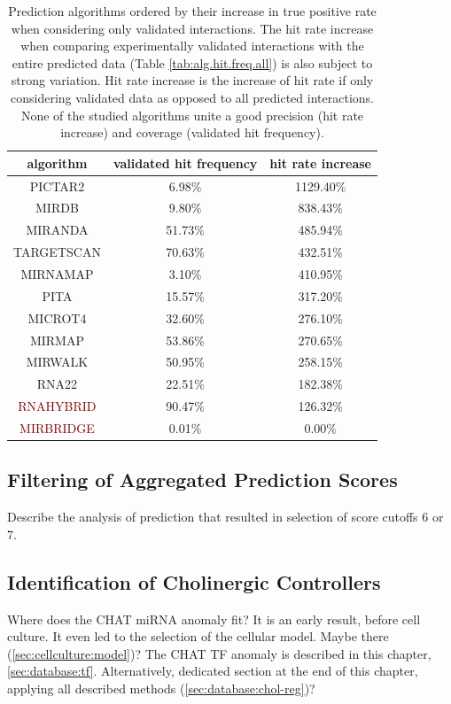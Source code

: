 \begin{table}
\centering
\begin{tabular}{c | c | c}
algorithm & validated hit frequency & hit rate increase\\ \hline
\hline
\textcolor{OliveGreen}{PICTAR2} & 6.98\% & 1129.40\%\\ \hline
\textcolor{OliveGreen}{MIRDB} & 9.80\% & 838.43\%\\ \hline
\textcolor{OliveGreen}{MIRANDA} & 51.73\% & 485.94\%\\ \hline
\textcolor{OliveGreen}{TARGETSCAN} & 70.63\% & 432.51\%\\ \hline
\textcolor{OliveGreen}{MIRNAMAP} & 3.10\% & 410.95\%\\ \hline
\textcolor{OliveGreen}{PITA} & 15.57\% & 317.20\%\\ \hline
\textcolor{OliveGreen}{MICROT4} & 32.60\% & 276.10\%\\ \hline
\textcolor{OliveGreen}{MIRMAP} & 53.86\% & 270.65\%\\ \hline
\textcolor{OliveGreen}{MIRWALK} & 50.95\% & 258.15\%\\ \hline
\textcolor{OliveGreen}{RNA22} & 22.51\% & 182.38\%\\ \hline
\textcolor{Maroon}{RNAHYBRID} & 90.47\% & 126.32\%\\ \hline
\textcolor{Maroon}{MIRBRIDGE} & 0.01\% & 0.00\%\\ \hline
\end{tabular}
\caption{Prediction algorithms ordered by their increase in true positive rate when considering only validated interactions. The hit rate increase when comparing experimentally validated interactions with the entire predicted data (Table \ref{tab:alg.hit.freq.all}) is also subject to strong variation. Hit rate increase is the increase of hit rate if only considering validated data as opposed to all predicted interactions. None of the studied algorithms unite a good precision (hit rate increase) and coverage (validated hit frequency).}
\label{tab:alg.hit.freq.val}
\end{table}

\subsection{Filtering of Aggregated Prediction Scores}
Describe the analysis of prediction that resulted in selection of score cutoffs 6 or 7.

\subsection{Identification of Cholinergic Controllers}
Where does the CHAT miRNA anomaly fit? It is an early result, before cell culture. It even led to the selection of the cellular model. Maybe there (\ref{sec:cellculture:model})? The CHAT TF anomaly is described in this chapter, \ref{sec:database:tf}. Alternatively, dedicated section at the end of this chapter, applying all described methods (\ref{sec:database:chol-reg})? 

